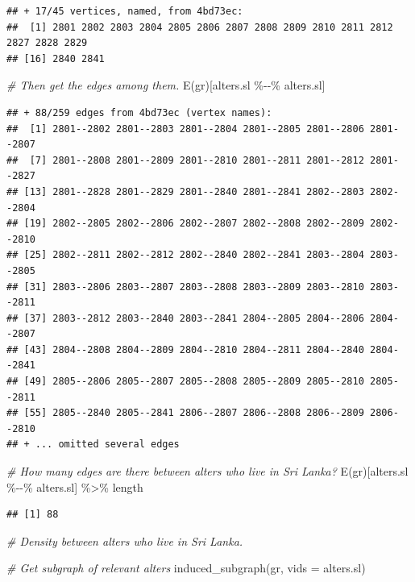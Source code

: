 \documentclass[
]{book}
\newenvironment{Shaded}{\begin{snugshade}}{\end{snugshade}}
\newcommand{\AttributeTok}[1]{\textcolor[rgb]{0.77,0.63,0.00}{#1}}
\newcommand{\CommentTok}[1]{\textcolor[rgb]{0.56,0.35,0.01}{\textit{#1}}}
\newcommand{\FunctionTok}[1]{\textcolor[rgb]{0.00,0.00,0.00}{#1}}
\newcommand{\NormalTok}[1]{#1}
\newcommand{\SpecialCharTok}[1]{\textcolor[rgb]{0.00,0.00,0.00}{#1}}
\begin{document}
\begin{verbatim}
## + 17/45 vertices, named, from 4bd73ec:
##  [1] 2801 2802 2803 2804 2805 2806 2807 2808 2809 2810 2811 2812 2827 2828 2829
## [16] 2840 2841
\end{verbatim}

\begin{Shaded}
\begin{Highlighting}[]
\CommentTok{\# Then get the edges among them.}
\FunctionTok{E}\NormalTok{(gr)[alters.sl }\SpecialCharTok{\%{-}{-}\%}\NormalTok{ alters.sl]}
\end{Highlighting}
\end{Shaded}

\begin{verbatim}
## + 88/259 edges from 4bd73ec (vertex names):
##  [1] 2801--2802 2801--2803 2801--2804 2801--2805 2801--2806 2801--2807
##  [7] 2801--2808 2801--2809 2801--2810 2801--2811 2801--2812 2801--2827
## [13] 2801--2828 2801--2829 2801--2840 2801--2841 2802--2803 2802--2804
## [19] 2802--2805 2802--2806 2802--2807 2802--2808 2802--2809 2802--2810
## [25] 2802--2811 2802--2812 2802--2840 2802--2841 2803--2804 2803--2805
## [31] 2803--2806 2803--2807 2803--2808 2803--2809 2803--2810 2803--2811
## [37] 2803--2812 2803--2840 2803--2841 2804--2805 2804--2806 2804--2807
## [43] 2804--2808 2804--2809 2804--2810 2804--2811 2804--2840 2804--2841
## [49] 2805--2806 2805--2807 2805--2808 2805--2809 2805--2810 2805--2811
## [55] 2805--2840 2805--2841 2806--2807 2806--2808 2806--2809 2806--2810
## + ... omitted several edges
\end{verbatim}

\begin{Shaded}
\begin{Highlighting}[]
\CommentTok{\# How many edges are there between alters who live in Sri Lanka?}
\FunctionTok{E}\NormalTok{(gr)[alters.sl }\SpecialCharTok{\%{-}{-}\%}\NormalTok{ alters.sl] }\SpecialCharTok{\%\textgreater{}\%} 
\NormalTok{  length}
\end{Highlighting}
\end{Shaded}

\begin{verbatim}
## [1] 88
\end{verbatim}

\begin{Shaded}
\begin{Highlighting}[]
\CommentTok{\# Density between alters who live in Sri Lanka.}

\CommentTok{\# Get subgraph of relevant alters}
\FunctionTok{induced\_subgraph}\NormalTok{(gr, }\AttributeTok{vids =}\NormalTok{ alters.sl)}
\end{Highlighting}
\end{Shaded}
\end{document}
